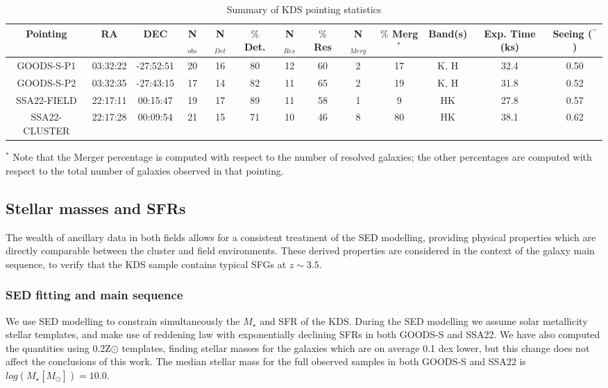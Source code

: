 \documentclass[fleqn,usenatbib]{mn2e}
\begin{document}
\begin{table*}
\centering
\begin{threeparttable}
\caption{Summary of KDS pointing statistics}
\label{tab:pointings}
\begin{tabular}{c c c c c c c c c c c c c}

 \hline
Pointing & RA & DEC & N$_{obs}$ & N$_{Det}$ & $\%$ Det. & N$_{Res}$ & $\%$ Res & N$_{Merg}$ & $\%$ Merg$^{*}$ & Band(s) & Exp. Time (ks) & Seeing ($^{\prime\prime}$)  \\
 \hline
 GOODS-S-P1 & 03:32:22 & -27:52:51 & 20 & 16 & 80 & 12 & 60 & 2 & 17 & K, H & 32.4 & 0.50 \\
GOODS-S-P2 & 03:32:35 & -27:43:15 & 17 & 14 & 82 & 11 & 65 & 2 & 19 & K, H & 31.8 & 0.52 \\
SSA22-FIELD & 22:17:11 & 00:15:47 & 19 & 17 & 89 & 11 & 58 & 1 & 9 & HK & 27.8 & 0.57 \\
SSA22-CLUSTER & 22:17:28 & 00:09:54 & 21 & 15 & 71 & 10 & 46 & 8 & 80 & HK & 38.1 & 0.62 \\
 \hline
\end{tabular}
\begin{tablenotes}
      \small
      \item $^{*}$ Note that the Merger percentage is computed with respect to the number of resolved galaxies; the other percentages are computed with respect to the total number of galaxies observed in that pointing.
    \end{tablenotes}
  \end{threeparttable}
  \end{table*}

\subsection{Stellar masses and SFRs}\label{subsec:stellar_masses_and_sfrs}
The wealth of ancillary data in both fields allows for a consistent treatment of the SED modelling, providing physical properties which are directly comparable between the cluster and field environments.
These derived properties are considered in the context of the galaxy main sequence, to verify that the KDS sample contains typical SFGs at $z\sim3.5$.   

\subsubsection{SED fitting and main sequence}\label{subsubsec:sed_fitting}
We use SED modelling to constrain simultaneously the $M_{\star}$ and SFR of the KDS.
During the SED modelling we assume solar metallicity stellar templates, and make use of \cite{Calzetti2000} reddening law with exponentially declining SFRs in both GOODS-S and SSA22.
We have also computed the quantities using 0.2Z$\odot$ templates, finding stellar masses for the galaxies which are on average 0.1 dex lower, but this change does not affect the conclusions of this work.
The median stellar mass for the full observed samples in both GOODS-S and SSA22 is $log(M_{\star}[M_{\odot}]) = 10.0$.
\end{document}
